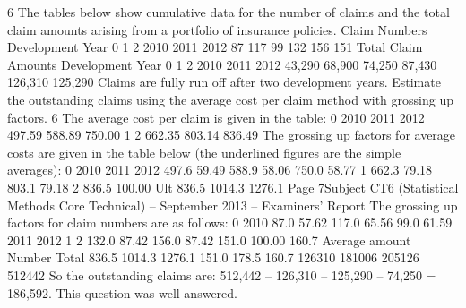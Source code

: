 \documentclass[a4paper,12pt]{article}
\begin{document}
6
The tables below show cumulative data for the number of claims and the total claim
amounts arising from a portfolio of insurance policies.
Claim Numbers
Development Year
0
1
2
2010
2011
2012
87
117
99
132
156
151
Total Claim Amounts
Development Year
0
1
2
2010
2011
2012
43,290
68,900
74,250
87,430 126,310
125,290
Claims are fully run off after two development years.
Estimate the outstanding claims using the average cost per claim method with
grossing up factors.
6
The average cost per claim is given in the table:
0
2010
2011
2012
497.59
588.89
750.00
1 2
662.35
803.14 836.49
The grossing up factors for average costs are given in the table below (the underlined
figures are the simple averages):
0
2010
2011
2012
497.6
59.49%
588.9
58.06%
750.0
58.77%
1
662.3
79.18%
803.1
79.18%
2
836.5
100.00%
Ult
836.5
1014.3
1276.1
Page 7Subject CT6 (Statistical Methods Core Technical) – September 2013 – Examiners’ Report
The grossing up factors for claim numbers are as follows:
0
2010
87.0
57.62%
117.0
65.56%
99.0
61.59%
2011
2012
1
2
132.0
87.42%
156.0
87.42%
151.0
100.00%
160.7
Average
amount Number Total
836.5
1014.3
1276.1 151.0
178.5
160.7 126310
181006
205126
512442
So the outstanding claims are:
512,442 – 126,310 – 125,290 – 74,250 = 186,592.
This question was well answered.
\end{document}
